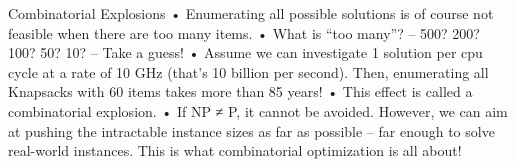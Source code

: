 Combinatorial Explosions
• Enumerating all possible solutions is of course not feasible
when there are too many items.
• What is “too many”?
– 500? 200? 100? 50? 10?
– Take a guess!
• Assume we can investigate 1 solution per cpu cycle at a
rate of 10 GHz (that’s 10 billion per second). Then,
enumerating all Knapsacks with 60 items takes more than
85 years!
• This effect is called a combinatorial explosion.
• If NP ≠ P, it cannot be avoided. However, we can aim at
pushing the intractable instance sizes as far as possible – far enough to solve real-world instances. This is what
combinatorial optimization is all about!
